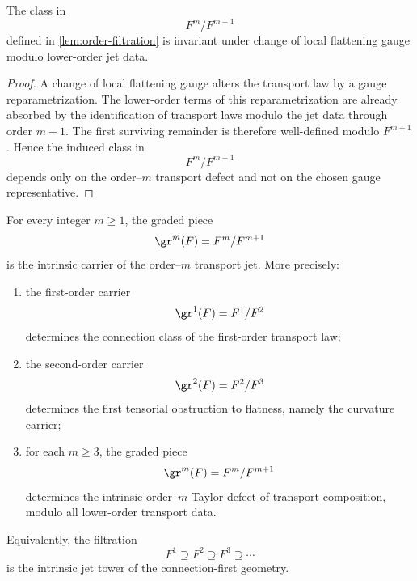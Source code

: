 \begin{lemma}
	\label{lem:gauge-order-m}
	The class in
	\[
		F^m/F^{m+1}
	\]
	defined in \cref{lem:order-filtration} is invariant under change of
	local flattening gauge modulo lower-order jet data.
\end{lemma}
\begin{proof}
	A change of local flattening gauge alters the transport law by a gauge
	reparametrization.  The lower-order terms of this reparametrization are
	already absorbed by the identification of transport laws modulo the jet
	data through order \(m-1\).  The first surviving remainder is therefore
	well-defined modulo \(F^{m+1}\).  Hence the induced class in
	\[
		F^m/F^{m+1}
	\]
	depends only on the order--\(m\) transport defect and not on the chosen
	gauge representative.
\end{proof}
\begin{theorem}
	\label{thm:jet-tower}
	For every integer \(m\ge 1\), the graded piece
	\[
		\gr^m(F)=F^m/F^{m+1}
	\]
	is the intrinsic carrier of the order--\(m\) transport jet.
	More precisely:
	\begin{enumerate}[label=\textup{(\roman*)}]
		\item
		      the first-order carrier
		      \[
			      \gr^1(F)=F^1/F^2
		      \]
		      determines the connection class of the first-order transport law;
		\item
		      the second-order carrier
		      \[
			      \gr^2(F)=F^2/F^3
		      \]
		      determines the first tensorial obstruction to flatness, namely the
		      curvature carrier;
		\item
		      for each \(m\ge 3\), the graded piece
		      \[
			      \gr^m(F)=F^m/F^{m+1}
		      \]
		      determines the intrinsic order--\(m\) Taylor defect of transport
		      composition, modulo all lower-order transport data.
	\end{enumerate}
	Equivalently, the filtration
	\[
		F^1 \supseteq F^2 \supseteq F^3 \supseteq \cdots
	\]
	is the intrinsic jet tower of the connection-first geometry.
\end{theorem}
